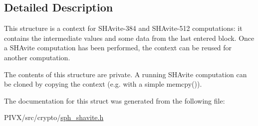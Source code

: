 \subsection{Detailed Description}
This structure is a context for S\+H\+Avite-\/384 and S\+H\+Avite-\/512 computations\+: it contains the intermediate values and some data from the last entered block. Once a S\+H\+Avite computation has been performed, the context can be reused for another computation.

The contents of this structure are private. A running S\+H\+Avite computation can be cloned by copying the context (e.\+g. with a simple {\ttfamily memcpy()}). 

The documentation for this struct was generated from the following file\+:\begin{DoxyCompactItemize}
\item 
P\+I\+V\+X/src/crypto/\mbox{\hyperlink{sph__shavite_8h}{sph\+\_\+shavite.\+h}}\end{DoxyCompactItemize}
